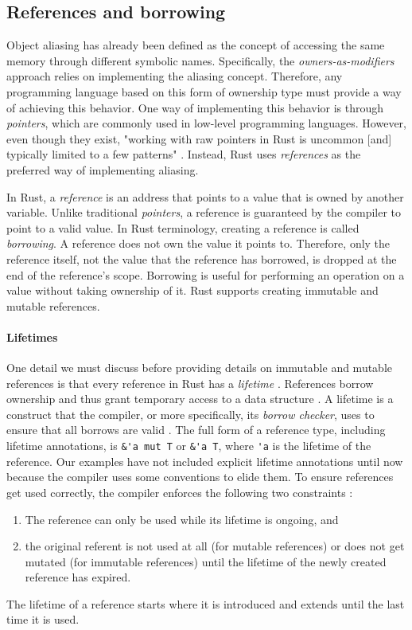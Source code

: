 \documentclass[sigplan,11pt,nonacm]{acmart}
\begin{document}
\subsection{References and borrowing}
\label{sec:rust-references}

Object aliasing has already been defined as the concept of accessing the same memory through different symbolic names.
Specifically, the \emph{owners-as-modifiers} approach relies on implementing the aliasing concept.
Therefore, any programming language based on this form of ownership type must provide a way of achieving this behavior.
One way of implementing this behavior is through \emph{pointers}, which are commonly used in low-level programming languages.
However, even though they exist, "working with raw pointers in Rust is uncommon [and] typically limited to a few patterns" \cite{rust-pointer-documentation}.
Instead, Rust uses \emph{references} as the preferred way of implementing aliasing.

In Rust, a \emph{reference} is an address that points to a value that is owned by another variable.
Unlike traditional \emph{pointers}, a reference is guaranteed by the compiler to point to a valid value.
In Rust terminology, creating a reference is called \emph{borrowing}.
A reference does not own the value it points to.
Therefore, only the reference itself, not the value that the reference has borrowed, is dropped at the end of the reference's scope.
Borrowing is useful for performing an operation on a value without taking ownership of it.
Rust supports creating immutable and mutable references.

\paragraph{Lifetimes}
\label{sec:rust-lifetimes}

One detail we must discuss before providing details on immutable and mutable references is that every reference in Rust has a \emph{lifetime} \cite{rust-book}.
References borrow ownership and thus grant temporary access to a data structure \cite{understanding-evolving-rust}.
A lifetime is a construct that the compiler, or more specifically, its \emph{borrow checker}, uses to ensure that all borrows are valid \cite{rust-by-example}.
The full form of a reference type, including lifetime annotations, is \verb|&'a mut T| or \verb|&'a T|, where \verb|'a| is the lifetime of the reference.
Our examples have not included explicit lifetime annotations until now because the compiler uses some conventions to elide them.
To ensure references get used correctly, the compiler enforces the following two constraints \cite{understanding-evolving-rust}:
\begin{enumerate}
  \item The reference can only be used while its lifetime is ongoing, and
  \item the original referent is not used at all (for mutable references) or does not get mutated (for immutable references) until the lifetime of the newly created reference has expired.
\end{enumerate}
The lifetime of a reference starts where it is introduced and extends until the last time it is used.
\end{document}
